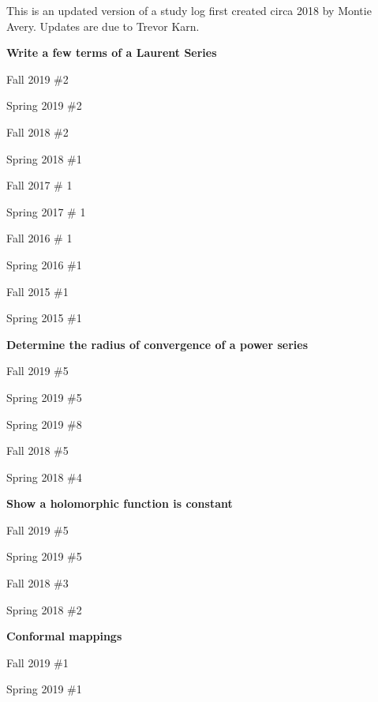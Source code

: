 \documentclass{article}
\begin{document}
\noindent This is an updated version of a study log first created circa 2018 by Montie Avery.
Updates are due to Trevor Karn.

\hfill

\textbf{Write a few terms of a Laurent Series}
\begin{todolist}
	\item Fall 2019 \#2
	\item Spring 2019 \#2
	\item Fall 2018 \#2
	\item Spring 2018 \#1
	\item Fall 2017 \# 1
	\item Spring 2017 \# 1
	\item Fall 2016 \# 1
	\item Spring 2016 \#1
	\item Fall 2015 \#1 
	\item Spring 2015 \#1
\end{todolist}

\textbf{Determine the radius of convergence of a power series}
\begin{todolist}
	\item Fall 2019 \#5
	\item Spring 2019 \#5
	\item Spring 2019 \#8
	\item Fall 2018 \#5
	\item Spring 2018 \#4
\end{todolist}

\textbf{Show a holomorphic function is constant}
\begin{todolist}
	\item Fall 2019 \#5
	\item Spring 2019 \#5
	\item Fall 2018 \#3
	\item Spring 2018 \#2
\end{todolist}

\textbf{Conformal mappings}
\begin{todolist}
	\item Fall 2019 \#1
	\item Spring 2019 \#1
\end{todolist}
\end{document}
